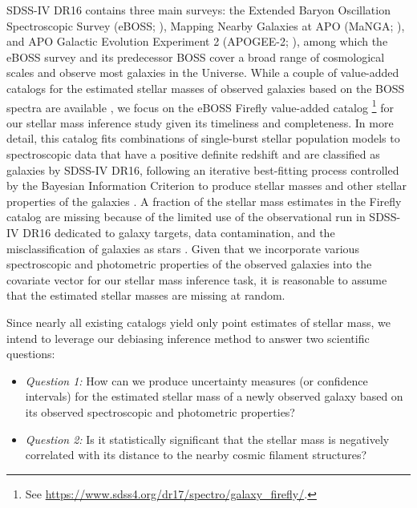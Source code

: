 \documentclass[ejsv2,noshowframe]{imsart}
\theoremstyle{plain}
\theoremstyle{definition}
\theoremstyle{remark}
\begin{document}
SDSS-IV DR16 contains three main surveys: the Extended Baryon Oscillation Spectroscopic Survey (eBOSS; \citealt{eBOSS2016}), Mapping Nearby Galaxies at APO (MaNGA; \citealt{MaNGA2014}), and APO
Galactic Evolution Experiment 2 (APOGEE-2; \citealt{APOGEE2017}), among which the eBOSS survey and its predecessor BOSS cover a broad range of cosmological scales and observe most galaxies in the Universe. While a couple of value-added catalogs for the estimated stellar masses of observed galaxies based on the BOSS spectra are available \citep{blanton2005new,conroy2009propagation,chang2015stellar}, we focus on the eBOSS Firefly value-added catalog \citep{Comparat2017}
\footnote{See \url{https://www.sdss4.org/dr17/spectro/galaxy_firefly/}.} 
for our stellar mass inference study given its timeliness and completeness. In more detail, this catalog fits combinations of single-burst stellar population models to spectroscopic data that have a positive definite redshift and are classified as galaxies by SDSS-IV DR16, following an iterative best-fitting process controlled by the Bayesian Information Criterion to produce stellar masses and other stellar properties of the galaxies \citep{wilkinson2017firefly}. A fraction of the stellar mass estimates in the Firefly catalog are missing because of the limited use of the observational run in SDSS-IV DR16 dedicated to galaxy targets, data contamination, and the misclassification of galaxies as stars \citep{Comparat2017}. Given that we incorporate various spectroscopic and photometric properties of the observed galaxies into the covariate vector for our stellar mass inference task, it is reasonable to assume that the estimated stellar masses are missing at random.

Since nearly all existing catalogs yield only point estimates of stellar mass, we intend to leverage our debiasing inference method to answer two scientific questions:
\begin{itemize}
	\item {\it Question 1:} How can we produce uncertainty measures (or confidence intervals) for the estimated stellar mass of a newly observed galaxy based on its observed spectroscopic and photometric properties?
	
	\item {\it Question 2:} Is it statistically significant that the stellar mass is negatively correlated with its distance to the nearby cosmic filament structures?
\end{itemize}
\end{document}
